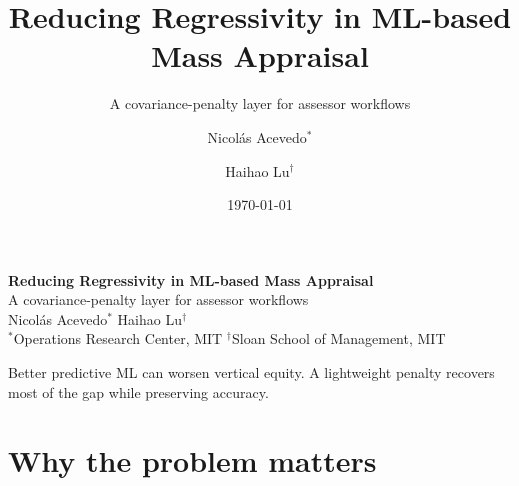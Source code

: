 \documentclass[aspectratio=169,10pt]{beamer}
\title[Reducing Regressivity in ML]{Reducing Regressivity in ML-based Mass Appraisal}
\subtitle{A covariance-penalty layer for assessor workflows}
\author{Nicol\'as Acevedo$^*$ \and Haihao Lu$^\dagger$}
\date{\today}
\begin{document}
\begin{frame}[plain]
\vspace{9mm}
{\color{white}
\begin{center}
{\LARGE\bfseries Reducing Regressivity in ML-based Mass Appraisal}\\[2mm]
{\large A covariance-penalty layer for assessor workflows}\\[8mm]
{\normalsize Nicol\'as Acevedo$^*$ \quad Haihao Lu$^\dagger$}\\[2mm]
{\footnotesize $^*$Operations Research Center, MIT \quad $^\dagger$Sloan School of Management, MIT}\\[11mm]
\begin{minipage}{0.72\linewidth}
\centering
{\large Better predictive ML can worsen vertical equity. A lightweight penalty recovers most of the gap while preserving accuracy.}
\end{minipage}
\end{center}}
\end{frame}

\section{Why the problem matters}
\end{document}

